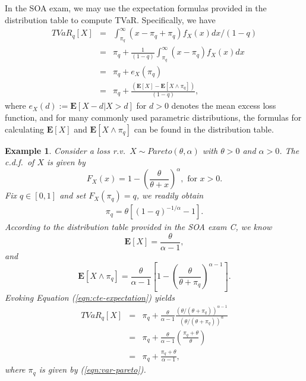 \documentclass[12pt]{article}
\newtheorem{example}{\bf Example}
\begin{document}
In the SOA exam, we may use the expectation formulas provided in the distribution table to compute TVaR.  Specifically, we have
\begin{eqnarray}
\label{eqn:cte-expectation}
  TVaR_q[X] &=& \int_{\pi_q}^{\infty} (x-\pi_q+\pi_q)f_X(x)dx/(1-q) \nonumber\\
&=& \pi_q+\frac{1}{(1-q)}\int_{\pi_q}^{\infty} (x-\pi_q)f_X(x)dx\nonumber\\
&=& \pi_q+e_X(\pi_q)\nonumber\\
&=& \pi_q +\frac{\left({\mathbf{E}[X]-\mathbf{E}[X\wedge\pi_q]}\right)}{(1-q)},
\end{eqnarray}
where $e_X(d):=\mathbf{E}[X-d|X>d]$ for $d>0$ denotes the mean excess loss function, and for many commonly used parametric distributions, the formulas for calculating $\mathbf{E}[X]$ and $\mathbf{E}[X\wedge\pi_q]$ can be found in the distribution table.

\begin{example}
Consider a loss r.v.\ $X\sim Pareto(\theta,\alpha)$ with $\theta>0$ and $\alpha>0$.  The c.d.f.\ of $X$ is given by \[
F_X(x)=1-\left(\frac{\theta}{\theta+x} \right)^{\alpha}, \text{ for } x>0 .
\] Fix $q\in [0,1]$ and set $F_X(\pi_q)=q$, we readily obtain
\begin{eqnarray}
\label{eqn:var-pareto}
\pi_q=\theta\left[(1-q)^{-1/\alpha}-1 \right].
\end{eqnarray}
According to the distribution table provided in the SOA exam C, we know
\[
\mathbf{E}[X]=\frac{\theta}{\alpha-1},
\]
and \[
\mathbf{E}[X\wedge \pi_q]=\frac{\theta}{\alpha-1}\left[
1-\left(\frac{\theta}{\theta+\pi_q}\right)^{\alpha-1}
\right].
\]
Evoking Equation (\ref{eqn:cte-expectation}) yields
\begin{eqnarray*}
  TVaR_q[X] &=& \pi_q+\frac{\theta}{\alpha-1} \frac{(\theta/(\theta+\pi_q))^{\alpha-1}}
{(\theta/(\theta+\pi_q))^{\alpha}}\\
&=&\pi_q +\frac{\theta}{\alpha-1}\left( \frac{\pi_q+\theta}{\theta} \right)\\
&=& \pi_q+\frac{\pi_q+\theta}{\alpha-1},
\end{eqnarray*}
where $\pi_q$ is given by (\ref{eqn:var-pareto}).
\end{example}
\end{document}
